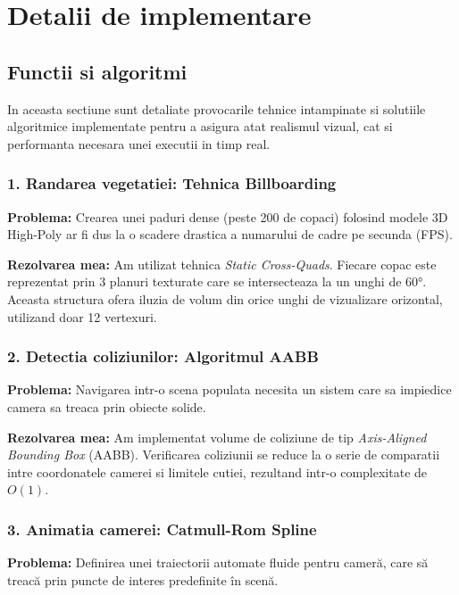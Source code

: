 \documentclass[11pt,a4paper]{article}
\begin{document}
\section{Detalii de implementare}

\subsection{Functii si algoritmi}
In aceasta sectiune sunt detaliate provocarile tehnice intampinate si solutiile algoritmice implementate pentru a asigura atat realismul vizual, cat si performanta necesara unei executii in timp real.

\subsubsection{1. Randarea vegetatiei: Tehnica Billboarding}
\textbf{Problema:} Crearea unei paduri dense (peste 200 de copaci) folosind modele 3D High-Poly ar fi dus la o scadere drastica a numarului de cadre pe secunda (FPS).

\textbf{Rezolvarea mea:} Am utilizat tehnica \textit{Static Cross-Quads}. Fiecare copac este reprezentat prin 3 planuri texturate care se intersecteaza la un unghi de 60°. Aceasta structura ofera iluzia de volum din orice unghi de vizualizare orizontal, utilizand doar 12 vertexuri.

\subsubsection{2. Detectia coliziunilor: Algoritmul AABB}
\textbf{Problema:} Navigarea intr-o scena populata necesita un sistem care sa impiedice camera sa treaca prin obiecte solide.

\textbf{Rezolvarea mea:} Am implementat volume de coliziune de tip \textit{Axis-Aligned Bounding Box} (AABB). Verificarea coliziunii se reduce la o serie de comparatii intre coordonatele camerei si limitele cutiei, rezultand intr-o complexitate de $O(1)$.

\subsubsection{3. Animatia camerei: Catmull-Rom Spline}
\textbf{Problema:} Definirea unei traiectorii automate fluide pentru cameră, care să treacă prin puncte de interes predefinite în scenă.
\end{document}
